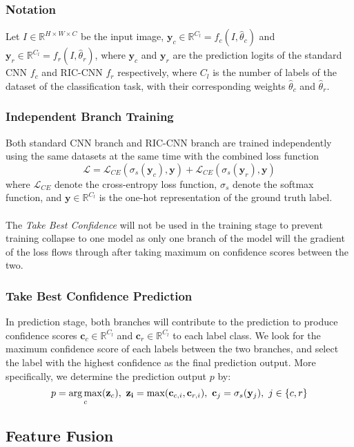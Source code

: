 \subsubsection{Notation}
Let $I \in \mathbb{R}^{H \times W \times C}$ be the input image, $\mathbf{y}_c \in \mathbb{R}^{C_l} = f_c(I, \hat{\theta}_c)$ and $\mathbf{y}_r \in \mathbb{R}^{C_l} = f_r(I, \hat{\theta}_r)$, where $\mathbf{y}_c$ and $\mathbf{y}_r$ are the prediction logits of the standard CNN $f_c$ and RIC-CNN $f_r$ respectively, where $C_l$ is the number of labels of the dataset of the classification task, with their corresponding weights $\hat{\theta}_c$ and $\hat{\theta}_r$.

\subsubsection{Independent Branch Training}
Both standard CNN branch and RIC-CNN branch are trained independently using the same datasets at the same time with the combined loss function
$$
\mathcal{L} = \mathcal{L}_{CE}(\sigma_s(\mathbf{y}_c), \mathbf{y}) + \mathcal{L}_{CE}(\sigma_s(\mathbf{y}_r), \mathbf{y})
$$
where $\mathcal{L}_{CE}$ denote the cross-entropy loss function, $\sigma_s$ denote the softmax function, and $\mathbf{y} \in \mathbb{R}^{C_l}$ is the one-hot representation of the ground truth label.
\\ \\
The \textit{Take Best Confidence} will not be used in the training stage to prevent training collapse to one model as only one branch of the model will the gradient of the loss flows through after taking maximum on confidence scores between the two.

\subsubsection{Take Best Confidence Prediction}
In prediction stage, both branches will contribute to the prediction to produce confidence scores $\mathbf{c}_c \in \mathbb{R}^{C_l}$ and $\mathbf{c}_r \in \mathbb{R}^{C_l}$ to each label class. We look for the maximum confidence score of each labels between the two branches, and select the label with the highest confidence as the final prediction output.
More specifically, we determine the prediction output $p$ by:
$$
p = \argmax_c(\mathbf{z}_c),\ \mathbf{z_i} = \max(\mathbf{c}_{c,i}, \mathbf{c}_{r,i}),\ \mathbf{c}_j = \sigma_s(\mathbf{y}_j),\ j \in \{c, r\}
$$
\subsection{Feature Fusion}

